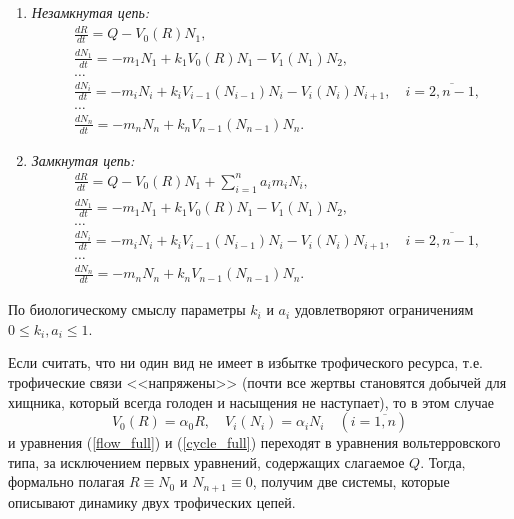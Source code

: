     \begin{enumerate}[label={\asbuk*)}, ref=\asbuk*]
        \item \textit{Незамкнутая цепь:}
        \begin{equation}  \label{flow_full}
            \begin{split}
                & \frac{dR}{dt} = Q - V_0(R) N_1, \\
                & \frac{dN_1}{dt} = -m_1 N_1 + k_1 V_0(R) N_1 - V_1(N_1) N_2, \\
                & \dots \\
                & \frac{dN_i}{dt} = -m_i N_i + k_i V_{i-1}(N_{i-1}) N_i - V_i(N_i) N_{i+1}, \quad i=\overline{2,n-1}, \\
                & \dots \\
                & \frac{dN_n}{dt} = -m_n N_n + k_n V_{n-1}(N_{n-1}) N_n.
            \end{split}
        \end{equation}

        \item \textit{Замкнутая цепь:}
        \begin{equation} \label{cycle_full}
            \begin{split}
                & \frac{dR}{dt} = Q - V_0(R) N_1  + \sum_{i=1}^{n} a_i m_i N_i, \\
                & \frac{dN_1}{dt} = -m_1 N_1 + k_1 V_0(R) N_1 - V_1(N_1) N_2, \\
                & \dots \\
                & \frac{dN_i}{dt} = -m_i N_i + k_i V_{i-1}(N_{i-1}) N_i - V_i(N_i) N_{i+1}, \quad i=\overline{2,n-1}, \\
                & \dots \\
                & \frac{dN_n}{dt} = -m_n N_n + k_n V_{n-1}(N_{n-1}) N_n.
            \end{split}
        \end{equation}
    \end{enumerate}

    По биологическому смыслу параметры $k_i$ и $a_i$ удовлетворяют ограничениям $ 0 \leq k_i, a_i \leq 1 $.

    Если считать, что ни один вид не имеет в избытке трофического ресурса, т.е. трофические связи <<напряжены>> (почти все жертвы становятся добычей для хищника, который всегда голоден и насыщения не наступает), то в этом случае
    \begin{equation}
        V_0(R) = \alpha_0 R, \quad V_i(N_i) = \alpha_i N_i \quad (i=\overline{1,n})
    \end{equation}
    и уравнения (\ref{flow_full}) и (\ref{cycle_full}) переходят в уравнения вольтерровского типа, за исключением первых уравнений, содержащих слагаемое \(Q\). Тогда, формально полагая \(R \equiv N_0\) и \( N_{n+1} \equiv 0 \), получим две системы, которые описывают динамику двух трофических цепей.  

